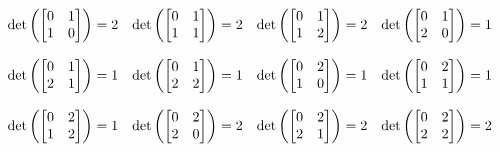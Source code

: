 \begin{mdframed}[style=darkAnswer,frametitle={Joe Starr}]
  $$
\begin{matrix}
\text{det}\lrp{\begin{bmatrix} 0 & 1 \\ 1 & 0 \end{bmatrix}}= 2 &
\text{det}\lrp{\begin{bmatrix} 0 & 1 \\ 1 & 1 \end{bmatrix}}= 2 &
\text{det}\lrp{\begin{bmatrix} 0 & 1 \\ 1 & 2 \end{bmatrix}}= 2 &
\text{det}\lrp{\begin{bmatrix} 0 & 1 \\ 2 & 0 \end{bmatrix}}= 1 \\ \hspace{.5in} \\
\text{det}\lrp{\begin{bmatrix} 0 & 1 \\ 2 & 1 \end{bmatrix}}= 1 &
\text{det}\lrp{\begin{bmatrix} 0 & 1 \\ 2 & 2 \end{bmatrix}}= 1 &
\text{det}\lrp{\begin{bmatrix} 0 & 2 \\ 1 & 0 \end{bmatrix}}= 1 &
\text{det}\lrp{\begin{bmatrix} 0 & 2 \\ 1 & 1 \end{bmatrix}}= 1 \\ \hspace{.5in} \\
\text{det}\lrp{\begin{bmatrix} 0 & 2 \\ 1 & 2 \end{bmatrix}}= 1 &
\text{det}\lrp{\begin{bmatrix} 0 & 2 \\ 2 & 0 \end{bmatrix}}= 2 &
\text{det}\lrp{\begin{bmatrix} 0 & 2 \\ 2 & 1 \end{bmatrix}}= 2 &
\text{det}\lrp{\begin{bmatrix} 0 & 2 \\ 2 & 2 \end{bmatrix}}= 2 \\ \hspace{.5in} \\

\end{matrix}$$
\end{mdframed}
